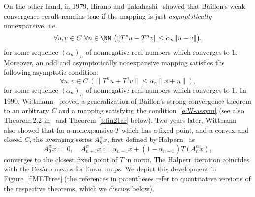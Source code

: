 On the other hand, in 1979, Hirano and Takahashi~\cite{Hirano1979} showed that Baillon's weak convergence result remains true if the mapping is just {\em asymptotically} nonexpansive, i.e. 
\[
\forall u,v\in C\ \forall n\in\NN\ \big( \|T^nu-T^nv\|\leq \alpha_n\|u-v\|\big),
\]
for some sequence $(\alpha_n)_n$ of nonnegative real numbers which converges to $1$. 
Moreover, an odd and asymptotically nonexpansive
mapping satisfies the following asymptotic condition:
\[
\forall u,v\in C\ (\| T^nu + T^nv \| \leq \alpha_n\|x + y\|), \tag{$W^-$}\label{e:W-assym}
\]
for some sequence $(\alpha_n)_n$ of nonnegative real numbers which converges to $1$. In 1990, Wittmann~\cite{Wittmann90}
proved a generalization of Baillon's strong convergence theorem 
to an arbitrary $C$ and a mapping satisfying the condition~\eqref{e:W-assym} (see also Theorem 2.2 in~\cite{Wittmann90} and Theorem~\ref{t:fin21ar} below).
Two years later, Wittmann~\cite{Wittmann1992} also showed that for a nonexpansive $T$ which has a fixed point, and a convex and closed $C$, the averaging series $A^\alpha_nx$, first defined by Halpern~\cite{Halpern1967} as
\[
A^\alpha_0x:=0,\quad A^\alpha_{n+1}x:=\alpha_{n+1}x+(1-\alpha_{n+1})T(A^\alpha_nx),
\] converges to the closest fixed point of $T$ in norm. The Halpern iteration coincides
with the Ces{\`a}ro means for linear maps.
We depict this development in Figure~\ref{f:METtree} (the references in parentheses refer to
quantitative versions of the respective theorems, which we discuss below).
